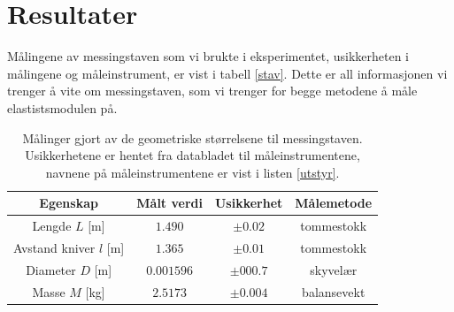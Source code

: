 \documentclass[%
 reprint,
 amsmath,amssymb,
 aps,
]{revtex4-1}
\begin{document}
\section{Resultater}
Målingene av messingstaven som vi brukte i eksperimentet, usikkerheten i målingene og måleinstrument, er vist i tabell \vref{stav}. Dette er all informasjonen vi trenger å vite om messingstaven, som vi trenger for begge metodene å måle elastistsmodulen på.
\begin{table}[h!]
\centering
\caption{Målinger gjort av de geometriske størrelsene til messingstaven. Usikkerhetene er hentet fra databladet til måleinstrumentene, navnene på måleinstrumentene er vist i listen \vref{utstyr}.}
\label{stav}
\begin{tabular}{cccc}
    Egenskap & Målt verdi      &    Usikkerhet & Målemetode \\
    \hline
    Lengde $L$ [m] & $1.490$    & $\pm 0.02$  & tommestokk  \\
    Avstand kniver $l$ [m] & $1.365$ & $\pm0.01$ & tommestokk \\
    Diameter $D$ [m] & $0.001596$    & $\pm000.7$ & skyvelær    \\
    Masse $M$    [kg]  & $2.5173$   & $\pm0.004$   & balansevekt \\  \hline
\end{tabular}
\end{table}
\end{document}
